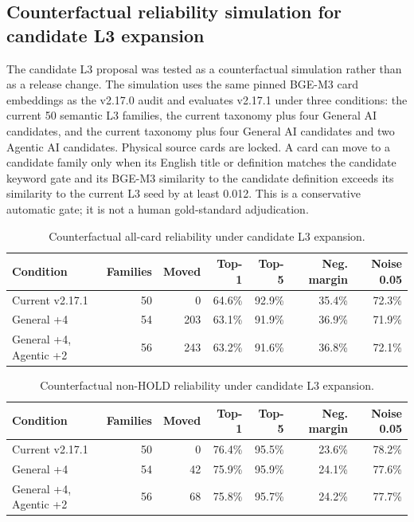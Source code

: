 \documentclass[11pt,a4paper]{article}
\begin{document}
\subsection{Counterfactual reliability simulation for candidate L3 expansion}

The candidate L3 proposal was tested as a counterfactual simulation rather
than as a release change. The simulation uses the same pinned BGE-M3 card
embeddings as the v2.17.0 audit and evaluates v2.17.1 under three conditions:
the current 50 semantic L3 families, the current taxonomy plus four General AI
candidates, and the current taxonomy plus four General AI candidates and two
Agentic AI candidates. Physical source cards are locked. A card can move to a
candidate family only when its English title or definition matches the
candidate keyword gate and its BGE-M3 similarity to the candidate definition
exceeds its similarity to the current L3 seed by at least 0.012. This is a
conservative automatic gate; it is not a human gold-standard adjudication.

\begin{table}[ht]
\centering
\caption{Counterfactual all-card reliability under candidate L3 expansion.}
\label{tab:l3-expansion-sim-all}
\begin{tabular}{lrrrrrr}
\toprule
Condition & Families & Moved & Top-1 & Top-5 & Neg. margin & Noise 0.05 \\
\midrule
Current v2.17.1 & 50 & 0 & 64.6\% & 92.9\% & 35.4\% & 72.3\% \\
General +4 & 54 & 203 & 63.1\% & 91.9\% & 36.9\% & 71.9\% \\
General +4, Agentic +2 & 56 & 243 & 63.2\% & 91.6\% & 36.8\% & 72.1\% \\
\bottomrule
\end{tabular}
\end{table}

\begin{table}[ht]
\centering
\caption{Counterfactual non-HOLD reliability under candidate L3 expansion.}
\label{tab:l3-expansion-sim-nonhold}
\begin{tabular}{lrrrrrr}
\toprule
Condition & Families & Moved & Top-1 & Top-5 & Neg. margin & Noise 0.05 \\
\midrule
Current v2.17.1 & 50 & 0 & 76.4\% & 95.5\% & 23.6\% & 78.2\% \\
General +4 & 54 & 42 & 75.9\% & 95.9\% & 24.1\% & 77.6\% \\
General +4, Agentic +2 & 56 & 68 & 75.8\% & 95.7\% & 24.2\% & 77.7\% \\
\bottomrule
\end{tabular}
\end{table}
\end{document}
